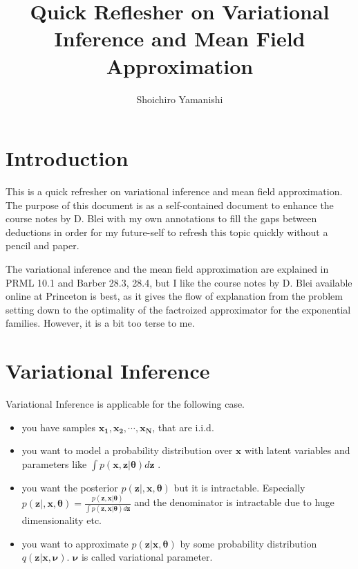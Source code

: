 \documentclass[a4]{article}
\title{Quick Reflesher on Variational Inference and Mean Field Approximation}
\author{Shoichiro Yamanishi}
\begin{document}
\maketitle


\section{Introduction}
This is a quick refresher on variational inference and mean field approximation.
The purpose of this document is as a self-contained document to enhance the course notes \cite{Blei1} by D. Blei 
with my own annotations to fill the gaps between deductions in order for my future-self 
to refresh this topic quickly without a pencil and paper.

The variational inference and the mean field approximation are explained in 
PRML\cite{bishop2007} 10.1 and Barber\cite{Barber2011} 28.3, 28.4, but I like the course notes \cite{Blei1} by D. Blei
available online at Princeton is best, as it gives the flow of explanation from the problem setting down to the optimality
of the factroized approximator for the exponential families. However, it is a bit too terse to me.


\section{Variational Inference}


Variational Inference is applicable for the following case.

\begin{itemize}
\item you have samples $\mathbf{x_1}, \mathbf{x_2}, \cdots, \mathbf{x_N}$, that are i.i.d.
\item you want to model a probability distribution over $\mathbf{x}$ with latent variables and parameters like $\int p(\mathbf{x},\mathbf{z}|\bm{\theta})d\mathbf{z}$ .
\item you want the posterior $p(\mathbf{z}|,\mathbf{x}, \bm{\theta})$ but it is intractable. Especially
$p(\mathbf{z}|,\mathbf{x}, \bm{\theta}) = \frac{p(\mathbf{z},\mathbf{x}| \bm{\theta})} {\int p(\mathbf{z},\mathbf{x}| \bm{\theta})d\mathbf{z}}$ and the denominator is intractable due to huge dimensionality etc.
\item you want to approximate $p(\mathbf{z}|\mathbf{x}, \bm{\theta})$ by some probability distribution 
$q(\mathbf{z}|\mathbf{x}, \bm{\nu})$. $\bm{\nu}$ is called variational parameter.
\end{itemize}
\end{document}
